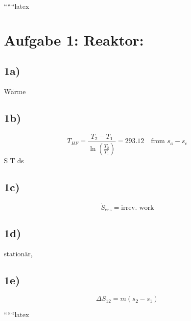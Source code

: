 
``````latex


\section*{Aufgabe 1: Reaktor:}

\subsection*{1a)}
Wärme

\subsection*{1b)}
\[
T_{HF} = \frac{T_2 - T_1}{\ln \left( \frac{T_2}{T_1} \right)} = 293.12 \quad \text{from } s_{a} - s_{e}
\]
 \int S T ds \rightarrow \text{)}

\subsection*{1c)}
\[
\dot{S}_{erz} = \text{irrev. work}
\]

\subsection*{1d)}
stationär,

\subsection*{1e)}
\[
\Delta S_{12} = m (s_2 - s_1)
\]

``````latex


